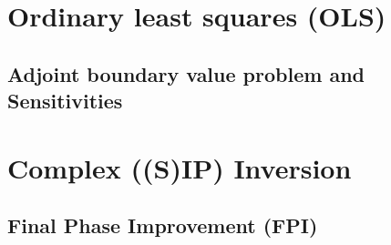 \section{Ordinary least squares (OLS)}\label{sect:crtomo_ols}
\subsection{Adjoint boundary value problem and Sensitivities}\label{sub:crtomo_adj}
\section{Complex ((S)IP) Inversion}\label{sect:crtomo_cmplx}
\subsection{Final Phase Improvement (FPI)}\label{sub:crtomo_fpi}
